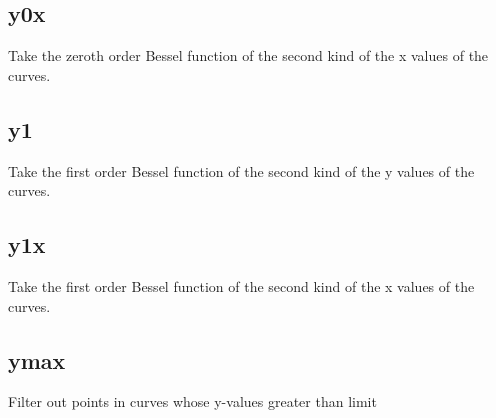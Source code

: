 \documentclass[letterpaper,10pt,english]{sphinxmanual}
\begin{document}
\subsection{y0x}
\label{\detokenize{math_operations:y0x}}
Take the zeroth order Bessel function of the second kind of the x values of the curves.

\begin{sphinxVerbatim}[commandchars=\\\{\}]
\PYG{p}{[}\PYG{p}{]}  
\end{sphinxVerbatim}


\subsection{y1}
\label{\detokenize{math_operations:y1}}
Take the first order Bessel function of the second kind of the y values of the curves.

\begin{sphinxVerbatim}[commandchars=\\\{\}]
\PYG{p}{[}\PYG{p}{]}  
\end{sphinxVerbatim}


\subsection{y1x}
\label{\detokenize{math_operations:y1x}}
Take the first order Bessel function of the second kind of the x values of the curves.

\begin{sphinxVerbatim}[commandchars=\\\{\}]
\PYG{p}{[}\PYG{p}{]}  
\end{sphinxVerbatim}


\subsection{ymax}
\label{\detokenize{math_operations:ymax}}
Filter out points in curves whose y-values greater than limit

\begin{sphinxVerbatim}[commandchars=\\\{\}]
\PYG{p}{[}\PYG{p}{]}   
\end{sphinxVerbatim}
\end{document}
